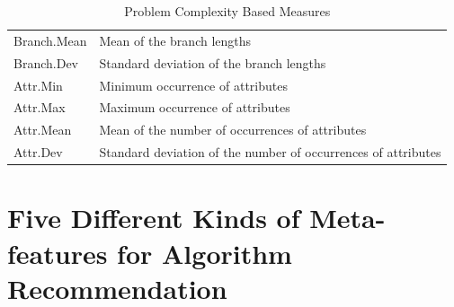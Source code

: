 \documentclass[prodmode,acmtkdd]{acmsmall}
\begin{document}
\begin{table}[!h]
\begin{minipage}{0.85\textwidth}
{\begin{tabular}{l|l}
        Branch.Mean & Mean of the branch lengths\\
        Branch.Dev & Standard deviation of the branch lengths\\
        \hline
        Attr.Min & Minimum occurrence of attributes\\
        Attr.Max & Maximum occurrence of attributes\\
        Attr.Mean & Mean of the number of occurrences of attributes\\
        Attr.Dev & Standard deviation of the number of occurrences of attributes\\
        \hline
        \end{tabular}
    }
    \end{minipage}
    \begin{minipage}{0.85\textwidth}
    \footnotesize
    \centering
    \renewcommand{\arraystretch}{0.9}
    \caption{Problem Complexity Based Measures}\label{tab:complexityMetrics}
    \end{minipage}
\end{table}

\section{Five Different Kinds of Meta-features for Algorithm Recommendation}\label{appendix:metaFeature}
\end{document}
